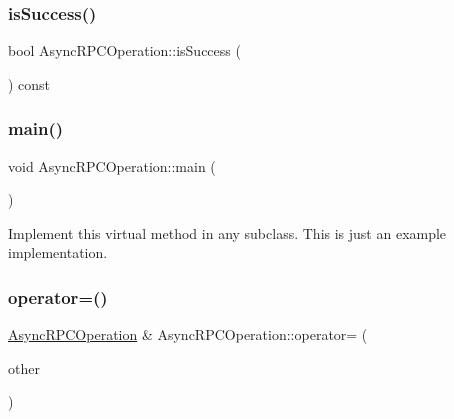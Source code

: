 \mbox{\label{class_async_r_p_c_operation_a657e5de4e0b4d36c5ead2ed225a04744}} 
\subsubsection{\texorpdfstring{is\+Success()}{isSuccess()}}
{\footnotesize\ttfamily bool Async\+R\+P\+C\+Operation\+::is\+Success (\begin{DoxyParamCaption}{ }\end{DoxyParamCaption}) const\hspace{0.3cm}{\ttfamily [inline]}}

\mbox{\label{class_async_r_p_c_operation_a37b00fb2684a303d04109b7e9b95ed36}} 
\subsubsection{\texorpdfstring{main()}{main()}}
{\footnotesize\ttfamily void Async\+R\+P\+C\+Operation\+::main (\begin{DoxyParamCaption}{ }\end{DoxyParamCaption})\hspace{0.3cm}{\ttfamily [virtual]}}

Implement this virtual method in any subclass. This is just an example implementation. \mbox{\label{class_async_r_p_c_operation_a2e741b291d755892418ef01506e28695}} 
\subsubsection{\texorpdfstring{operator=()}{operator=()}}
{\footnotesize\ttfamily \mbox{\hyperlink{class_async_r_p_c_operation}{Async\+R\+P\+C\+Operation}} \& Async\+R\+P\+C\+Operation\+::operator= (\begin{DoxyParamCaption}\item[{const \mbox{\hyperlink{class_async_r_p_c_operation}{Async\+R\+P\+C\+Operation}} \&}]{other }\end{DoxyParamCaption})\hspace{0.3cm}{\ttfamily [private]}}

